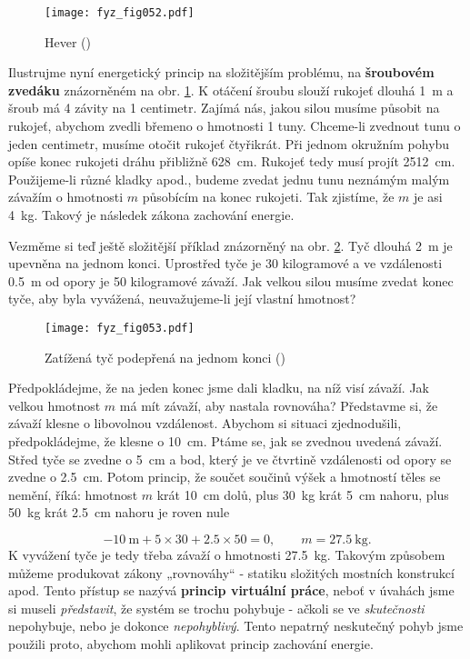 {    \begin{figure}[ht!]  %
      \centering
      \texttt{[image: fyz\_fig052.pdf]}
      \caption{Hever (\cite[s.~55]{Feynman01})}
      \label{fyz:fig052}
    \end{figure}
    Ilustrujme nyní energetický princip na složitějším problému, na \textbf{šroubovém zvedáku} 
    znázorněném na obr. \ref{fyz:fig052}. K otáčení šroubu slouží rukojeť dlouhá \SI{1}{\m} a šroub 
    má \num{4} závity na \num{1} centimetr. Zajímá nás, jakou silou musíme působit na rukojeť, 
    abychom zvedli břemeno o hmotnosti \num{1} tuny. Chceme-li zvednout tunu o jeden centimetr, 
    musíme otočit rukojeť čtyřikrát. Při jednom okružním pohybu opíše konec rukojeti dráhu 
    přibližně \SI{628}{\cm}. Rukojeť tedy musí projít \SI{2512}{\cm}. Použijeme-li různé kladky 
    apod., budeme zvedat jednu tunu neznámým malým závažím o hmotnosti \(m\) působícím na konec 
    rukojeti. Tak zjistíme, že \(m\) je asi \SI{4}{\kg}. Takový je následek zákona zachování 
    energie.

    Vezměme si teď ještě složitější příklad znázorněný na obr. \ref{fyz:fig053}. Tyč dlouhá 
    \SI{2}{\m} je upevněna na jednom konci. Uprostřed tyče je \num{30} kilogramové a ve vzdálenosti 
    \SI{0.5}{\m} od opory je \num{50} kilogramové závaží. Jak velkou silou musíme zvedat konec 
    tyče, aby byla vyvážená, neuvažujeme-li její vlastní hmotnost?
    
    \begin{figure}[ht!]  %
      \centering
      \texttt{[image: fyz\_fig053.pdf]}
      \caption{Zatížená tyč podepřená na jednom konci (\cite[s.~56]{Feynman01})}
      \label{fyz:fig053}
    \end{figure}
    
    Předpokládejme, že na jeden konec jsme dali kladku, na níž visí závaží. Jak velkou hmotnost 
    \(m\) má mít závaží, aby nastala rovnováha? Představme si, že závaží klesne o libovolnou 
    vzdálenost. Abychom si situaci zjednodušili, předpokládejme, že klesne o \SI{10}{cm}. Ptáme se, 
    jak se zvednou uvedená závaží. Střed tyče se zvedne o \SI{5}{\cm} a bod, který je ve čtvrtině 
    vzdálenosti od opory se zvedne o \SI{2.5}{\cm}. Potom princip, že součet součinů výšek a 
    hmotností těles se nemění, říká: hmotnost \(m\) krát \SI{10}{\cm} dolů, plus \SI{30}{\kg} krát 
    \SI{5}{\cm} nahoru, plus \SI{50}{\kg} krát \SI{2.5}{\cm} nahoru je roven nule
    
    \begin{equation*}
       -\SI{10}{\m} + \num{5}\times\num{30} + \num{2.5}\times\num{50} = \num{0}, 
       \qquad m = \SI{27.5}{\kg}.
    \end{equation*}
    K vyvážení tyče je tedy třeba závaží o hmotnosti \SI{27.5}{\kg}. Takovým způsobem můžeme 
    produkovat zákony „rovnováhy“ - statiku složitých mostních konstrukcí apod. Tento přístup se 
    nazývá \textbf{princip virtuální práce}, neboť v úvahách jsme si museli \emph{představit}, že 
    systém se trochu pohybuje - ačkoli se ve \emph{skutečnosti} nepohybuje, nebo je dokonce 
    \emph{nepohyblivý}. Tento nepatrný neskutečný pohyb jsme použili proto, abychom mohli aplikovat 
    princip zachování energie.

}
